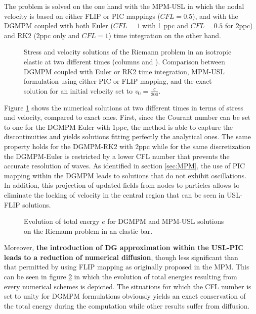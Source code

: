 The problem is solved on the one hand with the MPM-USL in which the nodal velocity is based on either FLIP or PIC mappings ($CFL=0.5$), and with the DGMPM coupled with both Euler ($CFL=1$ with 1 ppc and $CFL=0.5$ for 2ppc) and RK2 (2ppc only and $CFL=1$) time integration on the other hand.
\begin{figure}[h!]
  \centering
  { \label{subfig:rp_elastic1}}
  { \label{subfig:rp_elastic2}}
  
  \caption{Stress and velocity solutions of the Riemann problem in an isotropic elastic at two different times (columns  and ). Comparison between DGMPM coupled with Euler or RK2 time integration, MPM-USL formulation using either PIC or FLIP mapping, and the exact solution for an initial velocity set to $v_0=\frac{c}{200}$.}
  \label{fig:elastic_stress}
\end{figure}
Figure \ref{fig:elastic_stress} shows the numerical solutions at two different times in terms of stress and velocity, compared to exact ones. 
First, since the Courant number can be set to one for the DGMPM-Euler with 1ppc, the method is able to capture the discontinuities and yields solutions fitting perfectly the analytical ones. The same property holds for the DGMPM-RK2 with 2ppc while for the same discretization the DGMPM-Euler is restricted by a lower CFL number that prevents the accurate resolution of waves.
As identified in section \ref{sec:MPM}, the use of PIC mapping within the DGMPM leads to solutions that do not exhibit oscillations.
In addition, this projection of updated fields from nodes to particles allows to eliminate the locking of velocity in the central region that can be seen in USL-FLIP solutions.
\begin{figure}[h!]
  \centering
  
  \caption{Evolution of total energy $e$ for DGMPM and MPM-USL solutions on the Riemann problem in an elastic bar.}
  \label{fig:energy_elastic_RP}
\end{figure}
Moreover, \textbf{the introduction of DG approximation within the USL-PIC leads to a reduction of numerical diffusion}, though less significant than that permitted by using FLIP mapping as originally proposed in the MPM.
This can be seen in figure \ref{fig:energy_elastic_RP} in which the evolution of total energies resulting from every numerical schemes is depicted.
The situations for which the CFL number is set to unity for DGMPM formulations obviously yields an exact conservation of the total energy during the computation while other results suffer from diffusion.

